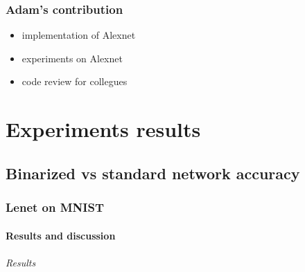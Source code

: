 \documentclass[licencjacka]{pracamgr}
\begin{document}
	\section{Adam's contribution}
		\begin{itemize}
			\item implementation of Alexnet
			\item experiments on Alexnet
			\item code review for collegues
		\end{itemize}

	
\part{Experiments results}
\chapter{Binarized vs standard network accuracy}

	\section{Lenet on MNIST}
		\subsection{Results and discussion}
		        \paragraph{Results} 
		     
\end{document}
